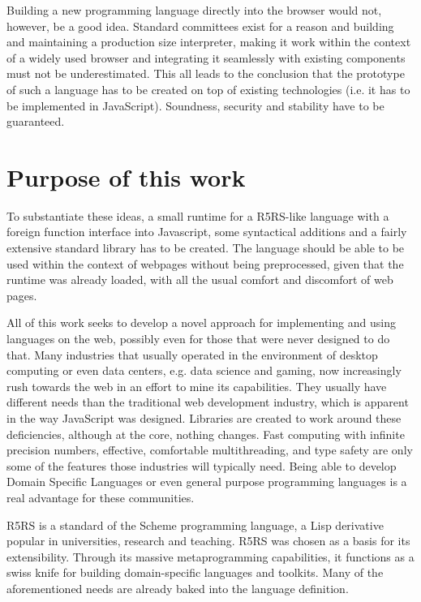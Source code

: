 \documentclass[oneside,11pt,xetex]{scrbook}
\begin{document}
Building a new programming language directly into the browser would not, however, be a good idea. Standard committees exist for a reason and building and maintaining a production size interpreter, making it work within the context of a widely used browser and integrating it seamlessly with existing components must not be underestimated. This all leads to the conclusion that the prototype of such a language has to be created on top of existing technologies (i.e. it has to be implemented in JavaScript). Soundness, security and stability have to be guaranteed.

\clearpage

\section*{Purpose of this work}
To substantiate these ideas, a small runtime for a R5RS-like language with a foreign function interface into Javascript, some syntactical additions and a fairly extensive standard library has to be created. The language should be able to be used within the context of webpages without being preprocessed, given that the runtime was already loaded, with all the usual comfort and discomfort of web pages.

All of this work seeks to develop a novel approach for implementing and using languages on the web, possibly even for those that were never designed to do that. Many industries that usually operated in the environment of desktop computing or even data centers, e.g. data science and gaming, now increasingly rush towards the web in an effort to mine its capabilities. They usually have different needs than the traditional web development industry, which is apparent in the way JavaScript was designed. Libraries are created to work around these deficiencies, although at the core, nothing changes. Fast computing with infinite precision numbers, effective, comfortable multithreading, and type safety are only some of the features those industries will typically need. Being able to develop Domain Specific Languages or even general purpose programming languages is a real advantage for these communities.

R5RS is a standard of the Scheme programming language, a Lisp derivative popular in universities, research and teaching. R5RS was chosen as a basis for its extensibility. Through its massive metaprogramming capabilities, it functions as a swiss knife for building domain-specific languages and toolkits. Many of the aforementioned needs are already baked into the language definition.
\end{document}
